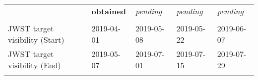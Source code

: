 \begin{tabular}{||  l|l|l|l|l ||}
                                       & {\footnotesize {\bf obtained}}  & {\footnotesize {\it pending}}   & {\footnotesize {\it pending}}  & {\footnotesize {\it pending}} \\
 &&&& \\
JWST target visibility (Start) & 2019-04-01    & 2019-05-08    & 2019-05-22   & 2019-06-07  \\ 
JWST target visibility (End)  & 2019-05-07    & 2019-07-01     & 2019-07-15   & 2019-07-29   \\ 
 &&&& \\
\hline\hline
\end{tabular}


